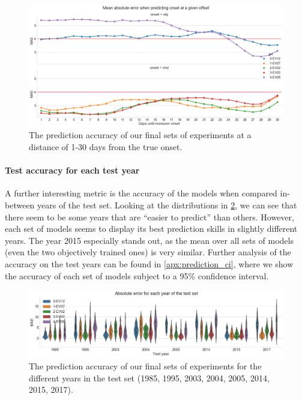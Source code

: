 \begin{figure}[h!]
  \centering
  \includegraphics[width=\linewidth]{./99_appendix/img/prediction_accuracy_offset}
  \caption{The prediction accuracy of our final sets of experiments at a distance of 1-30 days from the true onset.}
  \label{fig:e4_prediction_accuracy_offset}
\end{figure}

\paragraph{Test accuracy for each test year}
A further interesting metric is the accuracy of the models when compared in-between years of the test set. Looking at the distributions in \cref{fig:e4_prediction_years}, we can see that there seem to be some years that are ``easier to predict'' than others. However, each set of models seems to display its best prediction skills in slightly different years. The year 2015 especially stands out, as the mean over all sets of models (even the two objectively trained ones) is very similar. Further analysis of the accuracy on the test years can be found in \cref{apx:prediction_ci}, where we show the accuracy of each set of models subject to a 95\% confidence interval.

\begin{figure}[h!]
  \centering
  \includegraphics[width=\linewidth]{./99_appendix/img/prediction_years}
  \caption{The prediction accuracy of our final sets of experiments for the different years in the test set (1985, 1995, 2003, 2004, 2005, 2014, 2015, 2017).}
  \label{fig:e4_prediction_years}
\end{figure}

